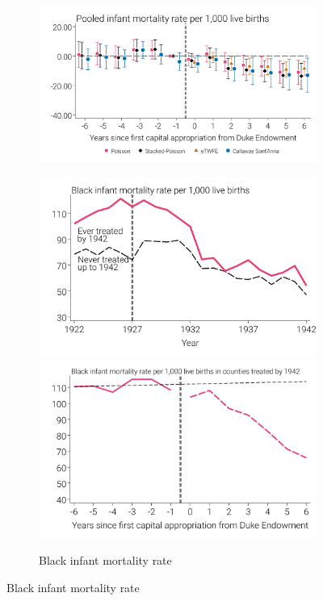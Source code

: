 \documentclass[12pt]{article}
\begin{document}
\begin{landscape}
\begin{figure}
\begin{minipage}{\linewidth}
\begin{subfigure}[b]{0.28\columnwidth}
        \includegraphics[width=\linewidth]{../analysis/output/main/figure_4a3_imr_event_study_pooled.pdf}
    \end{subfigure}
    \hfill %
    \begin{subfigure}[b]{0.28\textwidth}
        \centering
        \caption{{Black infant mortality rate}}\label{fig:imr-black}
        \includegraphics[width=\linewidth]{../analysis/output/main/figure_4b1_imr_by_treatment_status_black.pdf}
        \includegraphics[width=\linewidth]{../analysis/output/main/figure_4b2_imr_by_event_time_black.pdf}

\end{subfigure}
\end{minipage}
\end{figure}
\end{landscape}
\end{document}
